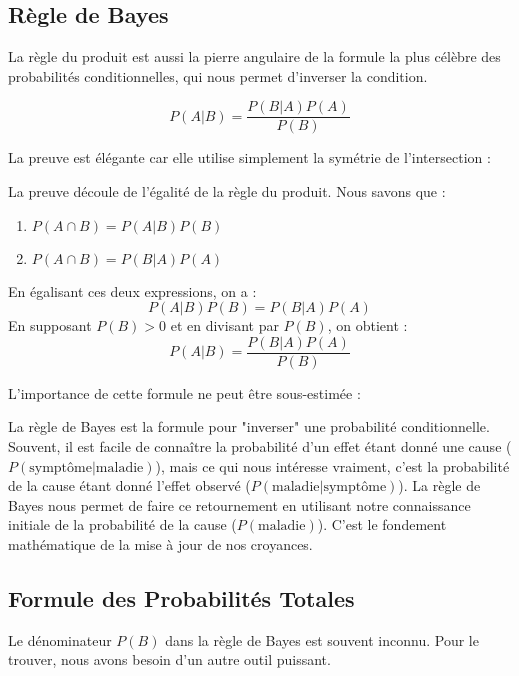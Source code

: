\subsection{Règle de Bayes}

La règle du produit est aussi la pierre angulaire de la formule la plus célèbre des probabilités conditionnelles, qui nous permet d'inverser la condition.

\begin{theorembox}
$$P(A|B) = \frac{P(B|A)P(A)}{P(B)}$$
\end{theorembox}

La preuve est élégante car elle utilise simplement la symétrie de l'intersection :

\begin{proofbox}
La preuve découle de l'égalité de la règle du produit. Nous savons que :
\begin{enumerate}
    \item $P(A \cap B) = P(A|B)P(B)$
    \item $P(A \cap B) = P(B|A)P(A)$
\end{enumerate}
En égalisant ces deux expressions, on a :
$$P(A|B)P(B) = P(B|A)P(A)$$
En supposant $P(B) > 0$ et en divisant par $P(B)$, on obtient :
$$P(A|B) = \frac{P(B|A)P(A)}{P(B)}$$
\end{proofbox}

L'importance de cette formule ne peut être sous-estimée :

\begin{intuitionbox}
La règle de Bayes est la formule pour "inverser" une probabilité conditionnelle. Souvent, il est facile de connaître la probabilité d'un effet étant donné une cause ($P(\text{symptôme}|\text{maladie})$), mais ce qui nous intéresse vraiment, c'est la probabilité de la cause étant donné l'effet observé ($P(\text{maladie}|\text{symptôme})$). La règle de Bayes nous permet de faire ce retournement en utilisant notre connaissance initiale de la probabilité de la cause ($P(\text{maladie})$). C'est le fondement mathématique de la mise à jour de nos croyances.
\end{intuitionbox}

\subsection{Formule des Probabilités Totales}

Le dénominateur $P(B)$ dans la règle de Bayes est souvent inconnu. Pour le trouver, nous avons besoin d'un autre outil puissant.

